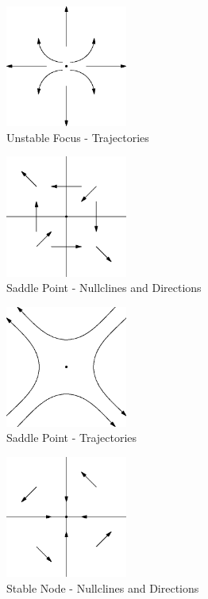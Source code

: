 \documentclass[fleqn,letterpaper]{report}
\begin{document}
\begin{figure}[t]
\centering
\includegraphics[width=4cm]{figure51.eps}
\caption{Unstable Focus - Trajectories}
\label{figure-unstable-focus-trajectories}
\end{figure}

\begin{figure}[t]
\centering
\includegraphics[width=4cm]{figure34.eps}
\caption{Saddle Point - Nullclines and Directions}
\label{figure-saddle-point-nullclines}
\end{figure}

\begin{figure}[t]
\centering
\includegraphics[width=4cm]{figure49.eps}
\caption{Saddle Point - Trajectories}
\label{figure-saddle-point-trajectories}
\end{figure}

\begin{figure}[t]
\centering
\includegraphics[width=4cm]{figure32.eps}
\caption{Stable Node - Nullclines and Directions}
\label{figure-stable-node-nullclines}
\end{figure}
\end{document}
